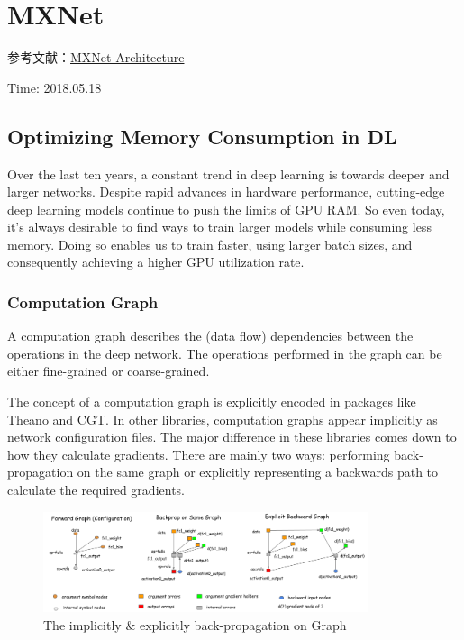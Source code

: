 \chapter{MXNet}

参考文献：\href{https://mxnet.incubator.apache.org/architecture/index.html}{MXNet Architecture}

{\color{red}Time: 2018.05.18}

\section{Optimizing Memory Consumption in DL}
Over the last ten years, a constant trend in deep learning is towards deeper and larger networks. Despite rapid advances in hardware performance, cutting-edge deep learning models continue to push the limits of GPU RAM. So even today, it’s always desirable to find ways to train larger models while consuming less memory. Doing so enables us to train faster, using larger batch sizes, and consequently achieving a higher GPU utilization rate.

\subsection{Computation Graph}
A computation graph describes the (data flow) dependencies between the operations in the deep network. The operations performed in the graph can be either fine-grained or coarse-grained.

The concept of a computation graph is explicitly encoded in packages like Theano and CGT. In other libraries, computation graphs appear implicitly as network configuration files. The major difference in these libraries comes down to how they calculate gradients. There are mainly two ways: performing back-propagation on the same graph or explicitly representing a backwards path to calculate the required gradients.

\begin{figure}[!hbtp]
\centering
\includegraphics[width=0.85\textwidth]{MXNet/back_graph}
\caption{The implicitly \& explicitly back-propagation on Graph}
\end{figure}

